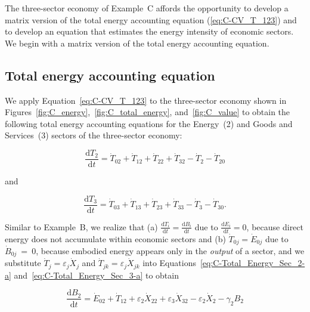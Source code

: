 The three-sector economy of Example~C affords the opportunity 
to develop a matrix version 
of the total energy accounting equation (\ref{eq:C-CV_T_123})
and to develop an equation that estimates the
energy intensity of economic sectors. 
We begin with a matrix version of the total energy accounting equation.


\subsection{Total energy accounting equation}

We apply Equation~\ref{eq:C-CV_T_123} to the three-sector
economy shown in 
Figures~\ref{fig:C_energy},~\ref{fig:C_total_energy}, and~\ref{fig:C_value}
to obtain the following total energy accounting equations
for the Energy~(2) and Goods and Services~(3) sectors 
of the three-sector economy:

\begin{equation} \label{eq:C-Total_Energy_Sec_2-a}
	\frac{\mathrm{d}T_{2}}{\mathrm{d}t} 
	= \dot{T}_{02}  
	+ \dot{T}_{12}
	+ \dot{T}_{22}
	+ \dot{T}_{32}
	- \dot{T}_{2}
	- \dot{T}_{20}
\end{equation}

\noindent{}and

\begin{equation} \label{eq:C-Total_Energy_Sec_3-a}
	\frac{\mathrm{d}T_{3}}{\mathrm{d}t} 
	= \dot{T}_{03}  
	+ \dot{T}_{13}
	+ \dot{T}_{23}
	+ \dot{T}_{33}
	- \dot{T}_{3}
	- \dot{T}_{30}.
\end{equation}

\noindent{}Similar to Example~B, we realize that 
(a) $\frac{\mathrm{d}T_i}{\mathrm{d}t} = \frac{\mathrm{d}B_i}{\mathrm{d}t}$ 
due to $\frac{\mathrm{d}E_i}{\mathrm{d}t} = 0$, because direct energy
does not accumulate within economic sectors and
(b) $\dot{T}_{0j} = \dot{E}_{0j}$ due to $\dot{B}_{0j}~=~0$, 
because embodied energy appears only in the \emph{output} of a sector, and
we substitute $\dot{T}_{j} = \varepsilon_{j} \dot{X}_{j}$ 
and $\dot{T}_{jk} = \varepsilon_{j} \dot{X}_{jk}$ 
into Equations~\ref{eq:C-Total_Energy_Sec_2-a}
and~\ref{eq:C-Total_Energy_Sec_3-a} to obtain

\begin{equation} \label{eq:C-Total_Energy_Sec_2-b}
	\frac{\mathrm{d}B_{2}}{\mathrm{d}t}
	= \dot{E}_{02}
	+ \dot{T}_{12}
	+ \varepsilon_{2} \dot{X}_{22}
	+ \varepsilon_{3} \dot{X}_{32}
	- \varepsilon_{2} \dot{X}_{2}
	- \gamma_{2} B_{2}
\end{equation}

